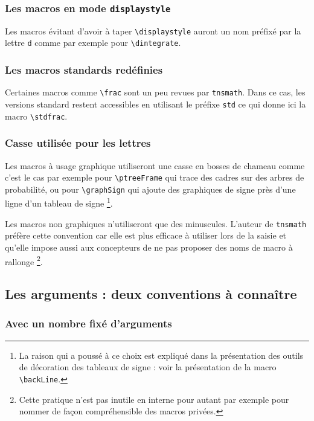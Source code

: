 \documentclass[12pt,a4paper]{book}
\newcommand\env[1]{\texttt{#1}}
\newcommand\macro[1]{\env{\textbackslash{}#1}}
\theoremstyle{definition}
\newcommand\prefix[1]{%
	\texttt{#1}%
}
\begin{document}
{{\subsubsection{Les macros en mode \texttt{displaystyle}}

Les macros évitant d'avoir à taper \macro{displaystyle} auront un nom préfixé par la lettre \prefix{d} comme par exemple pour \macro{dintegrate}.




\subsubsection{Les macros standards redéfinies}

Certaines macros comme \verb+\frac+ sont un peu revues par \verb+tnsmath+.
Dans ce cas, les versions standard restent accessibles en utilisant le préfixe \prefix{std} ce qui donne ici la macro \macro{stdfrac}.




\subsubsection{Casse utilisée pour les lettres}

Les macros à usage graphique utiliseront une casse en bosses de chameau comme c'est le cas par exemple
pour \macro{ptreeFrame} qui trace des cadres sur des arbres de probabilité,
ou pour \macro{graphSign} qui ajoute des graphiques de signe près d'une ligne d'un tableau de signe
\footnote{
	La raison qui a poussé à ce choix est expliqué dans la présentation des outils de décoration des tableaux de signe : voir la présentation de la macro \macro{backLine}.
}.

\medskip

Les macros non graphiques n'utiliseront que des minuscules. L'auteur de \verb#tnsmath# préfère cette convention car elle est plus efficace à utiliser lors de la saisie et qu'elle impose aussi aux concepteurs de ne pas proposer des noms de macro à rallonge
\footnote{
	Cette pratique n'est pas inutile en interne pour autant par exemple pour nommer de façon compréhensible des macros privées.
}.
\subsection{Les arguments : deux conventions à connaître}

\subsubsection{Avec un nombre fixé d'arguments}

}}
\end{document}
